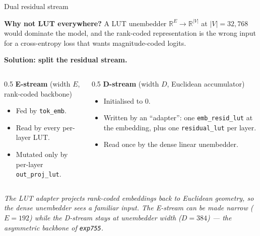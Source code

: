 \documentclass[aspectratio=169]{beamer}
\newcommand{\R}{\mathbb{R}}
\begin{document}
\begin{frame}{Dual residual stream}

\textbf{Why not LUT everywhere?} A LUT unembedder \(\R^{E} \to \R^{|V|}\) at \(|V| = 32{,}768\) would dominate the model, and the rank-coded representation is the wrong input for a cross-entropy loss that wants magnitude-coded logits.

\medskip
\textbf{Solution: split the residual stream.}

\begin{columns}[T,onlytextwidth]
\begin{column}{0.5\textwidth}
\textbf{E-stream} (width \(E\), rank-coded backbone)
\begin{itemize}
\item Fed by \texttt{tok\_emb}.
\item Read by every per-layer LUT.
\item Mutated only by per-layer \texttt{out\_proj\_lut}.
\end{itemize}
\end{column}
\begin{column}{0.5\textwidth}
\textbf{D-stream} (width \(D\), Euclidean accumulator)
\begin{itemize}
\item Initialised to \(0\).
\item Written by an ``adapter'': one \texttt{emb\_resid\_lut} at the embedding, plus one \texttt{residual\_lut} per layer.
\item Read once by the dense linear unembedder.
\end{itemize}
\end{column}
\end{columns}

\vspace{0.5em}
\small\emph{The LUT adapter projects rank-coded embeddings back to Euclidean geometry, so the dense unembedder sees a familiar input. The E-stream can be made narrow (\(E = 192\)) while the D-stream stays at unembedder width (\(D = 384\)) --- the asymmetric backbone of \texttt{exp755}.}
\end{frame}
\end{document}
